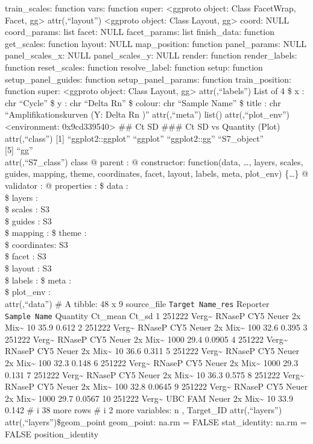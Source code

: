 \documentclass[
]{article}
\begin{document}
train\_scales: function vars: function super: \textless ggproto object:
Class FacetWrap, Facet, gg\textgreater{} attr(,``layout'')
\textless ggproto object: Class Layout, gg\textgreater{} coord: NULL
coord\_params: list facet: NULL facet\_params: list finish\_data:
function get\_scales: function layout: NULL map\_position: function
panel\_params: NULL panel\_scales\_x: NULL panel\_scales\_y: NULL
render: function render\_labels: function reset\_scales: function
resolve\_label: function setup: function setup\_panel\_guides: function
setup\_panel\_params: function train\_position: function super:
\textless ggproto object: Class Layout, gg\textgreater{}
attr(,``labels'') List of 4 \$ x : chr ``Cycle'' \$ y : chr ``Delta Rn''
\$ colour: chr ``Sample Name'' \$ title : chr ``Amplifikationskurven (Y:
Delta Rn )'' attr(,``meta'') list() attr(,``plot\_env'')
\textless environment: 0x9cd339540\textgreater{} \n\#\# Ct SD \n\n\#\#\#
Ct SD vs Quantity (Plot) \n\n attr(,``class'') {[}1{]}
``ggplot2::ggplot'' ``ggplot'' ``ggplot2::gg'' ``S7\_object''\\
{[}5{]} ``gg''\\
attr(,``S7\_class'') class @ parent : @ constructor: function(data,
\ldots, layers, scales, guides, mapping, theme, coordinates, facet,
layout, labels, meta, plot\_env) \{\ldots\} @ validator : @ properties :
\$ data : \\
\$ layers : \\
\$ scales : S3\\
\$ guides : S3\\
\$ mapping : \$ theme : \\
\$ coordinates: S3\\
\$ facet : S3\\
\$ layout : S3\\
\$ labels : \$ meta : \\
\$ plot\_env : \\
attr(,``data'') \# A tibble: 48 x 9 source\_file
\texttt{Target\ Name\_res} Reporter \texttt{Sample\ Name} Quantity
Ct\_mean Ct\_sd 1 251222 Verg\textasciitilde{} RNaseP CY5 Neuer 2x
Mix\textasciitilde{} 10 35.9 0.612 2 251222 Verg\textasciitilde{} RNaseP
CY5 Neuer 2x Mix\textasciitilde{} 100 32.6 0.395 3 251222
Verg\textasciitilde{} RNaseP CY5 Neuer 2x Mix\textasciitilde{} 1000 29.4
0.0905 4 251222 Verg\textasciitilde{} RNaseP CY5 Neuer 2x
Mix\textasciitilde{} 10 36.6 0.311 5 251222 Verg\textasciitilde{} RNaseP
CY5 Neuer 2x Mix\textasciitilde{} 100 32.3 0.148 6 251222
Verg\textasciitilde{} RNaseP CY5 Neuer 2x Mix\textasciitilde{} 1000 29.3
0.131 7 251222 Verg\textasciitilde{} RNaseP CY5 Neuer 2x
Mix\textasciitilde{} 10 36.3 0.575 8 251222 Verg\textasciitilde{} RNaseP
CY5 Neuer 2x Mix\textasciitilde{} 100 32.8 0.0645 9 251222
Verg\textasciitilde{} RNaseP CY5 Neuer 2x Mix\textasciitilde{} 1000 29.7
0.0567 10 251222 Verg\textasciitilde{} UBC FAM Neuer 2x
Mix\textasciitilde{} 10 33.9 0.142 \# i 38 more rows \# i 2 more
variables: n , Target\_ID attr(,``layers'')
attr(,``layers'')\$geom\_point geom\_point: na.rm = FALSE
stat\_identity: na.rm = FALSE position\_identity
\end{document}
